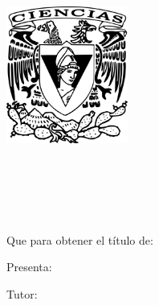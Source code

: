 
  
\begin{titlepage}
\AddToShipoutPicture*{\BackgroundPic}



\begin{addmargin}[-1cm]{-1cm}
\begin{center}
        \large

       \vspace{2cm}
        \includegraphics[width=4.0cm]{gfx/Escudo-FCIENCIAS.pdf} \\ \medskip
        \begingroup
            \spacedallcaps{\myUni} \\ \bigskip
        \endgroup
        
        \vfil
        
        \begingroup
            \spacedallcaps{\myFaculty} \\ \bigskip
        \endgroup
        
        \hfill

        \vfill
        
        \begingroup
            \color{CTtitle}\spacedallcaps{\myTitle} \\ \bigskip
        \endgroup
        \vfill
        \\[1.2cm]
        
        Que para obtener el título de: \\ \bigskip
        \myDegree

        \vspace{1.4cm}
        Presenta: \\ \bigskip
        \large{\spacedlowsmallcaps{\myName}}

        \vfill

        Tutor: \\ \bigskip
        \mySupervisor

      
        \vfill
        \myTime\ %

        \vfill

\end{center}

\end{addmargin}
\end{titlepage}
